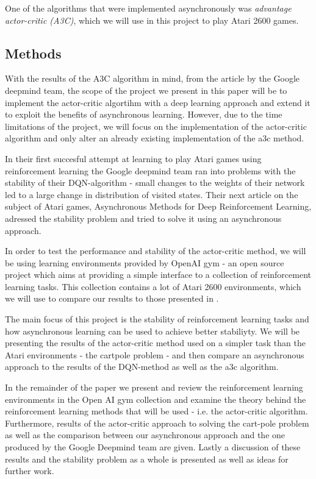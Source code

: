 \documentclass[11pt]{article}
\begin{document}
One of the algorithms that were implemented asynchronously
was \textit{advantage actor-critic (A3C)}, which we will use in this
project to play Atari 2600 games.

\subsection{Methods}

With the results of the A3C algorithm in mind, from the article by the
Google deepmind team\cite{a3c}, the scope of the project we present in
this paper will be to implement the actor-critic algortihm\cite{RLbook}
with a deep learning approach and extend it to exploit the benefits
of asynchronous learning.
However, due to the time limitations of the project, we will focus on
the implementation of the actor-critic algorithm and only alter
an already existing implementation of the a3c method.

In their first succesful attempt at learning to play Atari games using
reinforcement learning the Google deepmind team ran into problems with
the stability of their DQN-algorithm\cite{dqn} - small changes to the
weights of their network led to a large change in distribution of
visited states.
Their next article on the subject of Atari games, Asynchronous Methods for
Deep Reinforcement Learning\cite{a3c}, adressed the stability problem
and tried to solve it using an asynchronous approach.

In order to test the performance and stability of the actor-critic
method, we will be using learning environments provided by OpenAI
gym\cite{openAI} - an open source project which aims at providing
a simple interface to a collection of reinforcement learning tasks.
This collection contains a lot of Atari 2600 environments, which we will
use to compare our results to those presented in \cite{a3c}.

The main focus of this project is the stability of reinforcement learning
tasks and how asynchronous learning can be used to achieve better
stabiliyty.
We will be presenting the results of the actor-critic method used on a
simpler task than the Atari environments - the cartpole problem
\cite{cart_pole} - and then compare an asynchronous approach to the
results of the DQN-method\cite{dqn} as well as the a3c
algorithm\cite{a3c}.

In the remainder of the paper we present and review the reinforcement
learning environments in the Open AI gym collection and examine the
theory behind the reinforcement learning methods that will be used -
i.e. the actor-critic algorithm.
Furthermore, results of the actor-critic approach to solving the cart-pole
problem as well as the comparison between our asynchronous approach and
the one produced by the Google Deepmind team are given.
Lastly a discussion of these results and the stability problem as a whole
is presented as well as ideas for further work.


%
%
\end{document}
